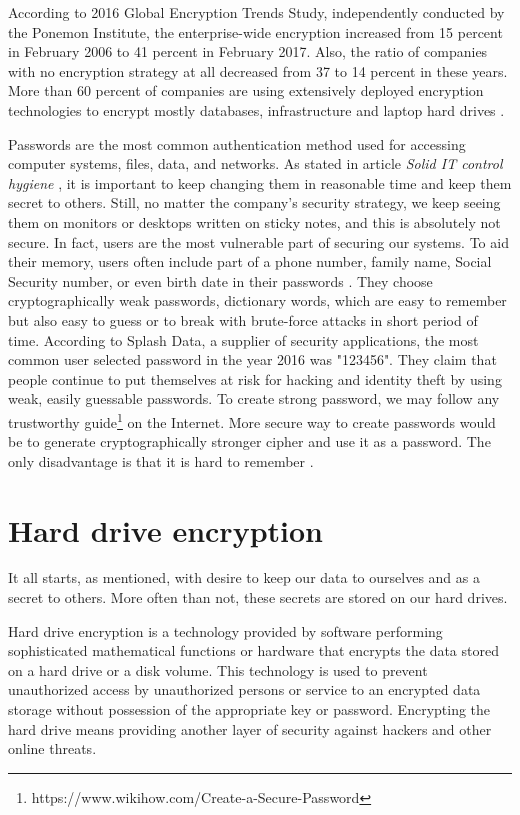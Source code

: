 According to 2016 Global Encryption Trends Study, independently conducted by the Ponemon Institute, the enterprise-wide encryption increased from 15 percent in February 2006 to 41 percent in February 2017.
Also, the ratio of companies with no encryption strategy at all decreased from 37 to 14 percent in these years.
More than 60 percent of companies are using extensively deployed encryption technologies to encrypt mostly databases, infrastructure and laptop hard drives \cite{Thales}.

Passwords are the most common authentication method used for accessing computer systems, files, data, and networks.
As stated in article {\it Solid IT control hygiene} \cite{Perry2017}\label{rotation}, it is important to keep changing them in reasonable time and keep them secret to others.
Still, no matter the company's security strategy, we keep seeing them on monitors or desktops written on sticky notes, and this is absolutely not secure.
In fact, users are the most vulnerable part of securing our systems.
To aid their memory, users often include part of a phone number, family name, Social Security number, or even birth date in their passwords \cite{pwdsec}.
They choose cryptographically weak passwords, dictionary words, which are easy to remember but also easy to guess or to break with brute-force attacks in short period of time.
According to Splash Data, a supplier of security applications, the most common user selected password in the year 2016 was "123456".
They claim that people continue to put themselves at risk for hacking and identity theft by using weak, easily guessable passwords.
To create strong password, we may follow any trustworthy guide\footnote{https://www.wikihow.com/Create-a-Secure-Password} on the Internet.
More secure way to create passwords would be to generate cryptographically stronger cipher and use it as a password.
The only disadvantage is that it is hard to remember \cite{splashdata}.



\section{Hard drive encryption}

It all starts, as mentioned, with desire to keep our data to ourselves and as a secret to others.
More often than not, these secrets are stored on our hard drives.

Hard drive encryption is a technology provided by software performing sophisticated mathematical functions or hardware that encrypts the data stored on a hard drive or a disk volume.
This technology is used to prevent unauthorized access by unauthorized persons or service to an encrypted data storage without possession of the appropriate key or password.
Encrypting the hard drive means providing another layer of security against hackers and other online threats.

